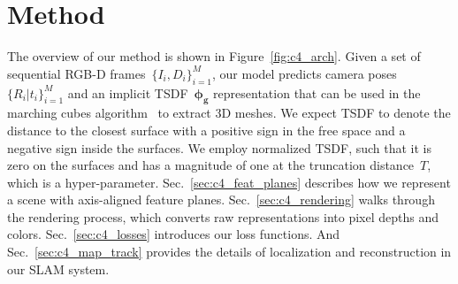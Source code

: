 \section{Method}
The overview of our method is shown in Figure~\ref{fig:c4_arch}. Given a set of sequential RGB-D frames~$\{I_{i}, D_{i}\}_{i=1}^M$, our model predicts camera poses~$\{R_{i}| t_{i}\}_{i=1}^M$ and an implicit TSDF~$\boldsymbol{\phi_{g}}$ representation that can be used in the marching cubes algorithm~\citep{lorensen1987marching} to extract 3D meshes. We expect TSDF to denote the distance to the closest surface with a positive sign in the free space and a negative sign inside the surfaces. We employ normalized TSDF, such that it is zero on the surfaces and has a magnitude of one at the truncation distance~$T$, which is a hyper-parameter. Sec.~\ref{sec:c4_feat_planes} describes how we represent a scene with axis-aligned feature planes. Sec.~\ref{sec:c4_rendering} walks through the rendering process, which converts raw representations into pixel depths and colors. Sec.~\ref{sec:c4_losses} introduces our loss functions. And Sec.~\ref{sec:c4_map_track} provides the details of localization and reconstruction in our SLAM system.

